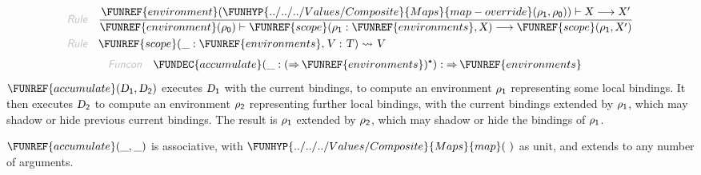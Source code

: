 \begin{align*}
  \KEY{Rule} \quad
    & \frac{
      \FUNREF{environment} (  \FUNHYP{../../../Values/Composite}{Maps}{map-override}
                                   (  \VAR{\ensuremath{\rho}}\SUB{1}, 
                                          \VAR{\ensuremath{\rho}}\SUB{0} ) ) \vdash \VAR{X} \TRANS 
        \VAR{X}'
      }{
      \FUNREF{environment} (  \VAR{\ensuremath{\rho}}\SUB{0} ) \vdash \FUNREF{scope}
                    (  \VAR{\ensuremath{\rho}}\SUB{1} : \FUNREF{environments}, 
                           \VAR{X} ) \TRANS 
        \FUNREF{scope}
          (  \VAR{\ensuremath{\rho}}\SUB{1}, 
                 \VAR{X}' )
      }
\\
  \KEY{Rule} \quad
    & \FUNREF{scope}
        (  \_ : \FUNREF{environments}, 
               \VAR{V} : \VAR{T} ) \leadsto 
        \VAR{V}
\end{align*}
\begin{align*}
  \KEY{Funcon} \quad
  & \FUNDEC{accumulate}(
                       \_ : (   \TO \FUNREF{environments} )\STAR) 
    :  \TO \FUNREF{environments} 
\end{align*}
$\FUNREF{accumulate}
    (  \VAR{D}\SUB{1}, 
           \VAR{D}\SUB{2} )$ executes $\VAR{D}\SUB{1}$ with the current bindings, to compute an
  environment $\VAR{\ensuremath{\rho}}\SUB{1}$ representing some local bindings. It then executes $\VAR{D}\SUB{2}$ to
  compute an environment $\VAR{\ensuremath{\rho}}\SUB{2}$ representing further local bindings, with the
  current bindings extended by $\VAR{\ensuremath{\rho}}\SUB{1}$, which may shadow or hide previous
  current bindings. The result is $\VAR{\ensuremath{\rho}}\SUB{1}$ extended by $\VAR{\ensuremath{\rho}}\SUB{2}$, which may shadow
  or hide the bindings of $\VAR{\ensuremath{\rho}}\SUB{1}$.

$\FUNREF{accumulate}
    (  \_, 
           \_ )$ is associative, with $\FUNHYP{../../../Values/Composite}{Maps}{map}
    (   \  )$ as unit, and extends to any
  number of arguments.

